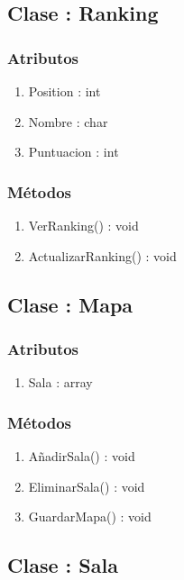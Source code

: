 \subsection{Clase : Ranking}\label{sec:uc0}
\subsubsection{Atributos}
\begin{enumerate}
\item Position : int
\item Nombre : char
\item Puntuacion : int
\end{enumerate}

\subsubsection{Métodos}
\begin{enumerate}
\item VerRanking() : void
\item ActualizarRanking() : void
\end{enumerate}




\subsection{Clase : Mapa}\label{sec:uc0}
\subsubsection{Atributos}
\begin{enumerate}
\item Sala : array
\end{enumerate}

\subsubsection{Métodos}
\begin{enumerate}
\item AñadirSala() : void
\item EliminarSala() : void
\item GuardarMapa() : void
\end{enumerate}




\subsection{Clase : Sala}\label{sec:uc0}
